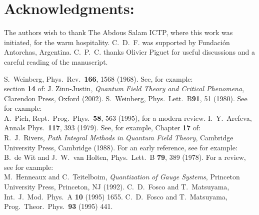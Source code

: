 \documentclass[a4paper,12pt]{article}
\begin{document}
\section*{Acknowledgments:}
The authors wish to thank The Abdous Salam ICTP, where this work was
initiated, for the warm hospitality.  C.~D.~F. was supported by
Fundaci\'on Antorchas, Argentina. C.~P.~C. thanks Olivier Piguet for useful
discussions and a careful reading of the manuscript.  
\newpage
\begin{thebibliography}{99}
S.\ Weinberg, Phys.\ Rev.\ {\bf 166}, 1568 (1968). 
See, for example:\\ section {\bf 14} of: J. Zinn-Justin, 
{\em Quantum Field Theory and Critical Phenomena\/}, Clarendon Press, 
Oxford (2002).
S.\ Weinberg, Phys.\ Lett.\ B{\bf 91}, 51 (1980). 
See for example:\\
A.~Pich, %
Rept.\ Prog.\ Phys.\  {\bf 58}, 563 (1995),
for a modern review.
I.~Y.~Arefeva,
  Annals Phys.\ {\bf 117}, 393 (1979).
See, for example, Chapter {\bf 17} of:\\
  R.\ J.\ Rivers, {\em Path Integral Methods in Quantum Field Theory},
  Cambridge University Press, Cambridge (1988).  
For an early reference, see for example:\\
  B.~de Wit and J.~W.~van Holten,
  Phys.\ Lett.\ B {\bf 79}, 389 (1978).
For a review, see for example:\\
  M.\ Henneaux and C.\ Teitelboim, {\em Quantization of Gauge
    Systems}, Princeton University Press, Princeton, NJ (1992).
C.~D.~Fosco and T.~Matsuyama, Int.\ J.\ Mod.\ Phys.\ A
  {\bf 10} (1995) 1655.  C.~D.~Fosco and T.~Matsuyama,
  Prog.\ Theor.\ Phys.\ {\bf 93} (1995) 441.
\end{thebibliography}
\end{document}
